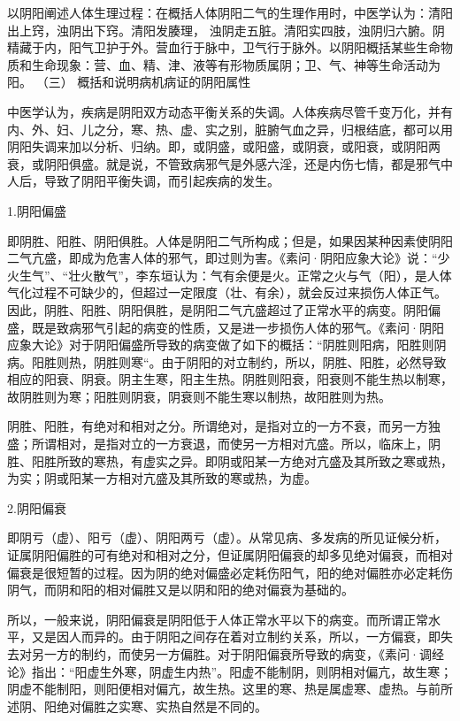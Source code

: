\documentclass[a4paper,12pt,UTF8,twoside]{ctexbook}
\begin{document}
以阴阳阐述人体生理过程：在概括人体阴阳二气的生理作用时，中医学认为：清阳出上窍，浊阴出下窍。清阳发腠理， 浊阴走五脏。清阳实四肢，浊阴归六腑。阴精藏于内，阳气卫护于外。营血行于脉中，卫气行于脉外。以阴阳概括某些生命物质和生命现象：营、血、精、津、液等有形物质属阴；卫、气、神等生命活动为阳。
（三） 概括和说明病机病证的阴阳属性

中医学认为，疾病是阴阳双方动态平衡关系的失调。人体疾病尽管千变万化，并有内、外、妇、儿之分，寒、热、虚、实之别，脏腑气血之异，归根结底，都可以用阴阳失调来加以分析、归纳。即，或阴盛，或阳盛，或阴衰，或阳衰，或阴阳两衰，或阴阳俱盛。就是说，不管致病邪气是外感六淫，还是内伤七情，都是邪气中人后，导致了阴阳平衡失调，而引起疾病的发生。

1.阴阳偏盛

即阴胜、阳胜、阴阳俱胜。人体是阴阳二气所构成；但是，如果因某种因素使阴阳二气亢盛，即成为危害人体的邪气，即过则为害。《素问·阴阳应象大论》说：“少火生气”、“壮火散气”，李东垣认为：气有余便是火。正常之火与气（阳），是人体气化过程不可缺少的，但超过一定限度（壮、有余），就会反过来损伤人体正气。因此，阴胜、阳胜、阴阳俱胜，是阴阳二气亢盛超过了正常水平的病变。阴阳偏盛，既是致病邪气引起的病变的性质，又是进一步损伤人体的邪气。《素问·阴阳应象大论》对于阴阳偏盛所导致的病变做了如下的概括：“阴胜则阳病，阳胜则阴病。阳胜则热，阴胜则寒“。由于阴阳的对立制约，所以，阴胜、阳胜，必然导致相应的阳衰、阴衰。阴主生寒，阳主生热。阴胜则阳衰，阳衰则不能生热以制寒，故阴胜则为寒；阳胜则阴衰，阴衰则不能生寒以制热，故阳胜则为热。

阴胜、阳胜，有绝对和相对之分。所谓绝对，是指对立的一方不衰，而另一方独盛；所谓相对，是指对立的一方衰退，而使另一方相对亢盛。所以，临床上，阴胜、阳胜所致的寒热，有虚实之异。即阴或阳某一方绝对亢盛及其所致之寒或热，为实；阴或阳某一方相对亢盛及其所致的寒或热，为虚。

2.阴阳偏衰

即阴亏（虚）、阳亏（虚）、阴阳两亏（虚）。从常见病、多发病的所见证候分析，证属阴阳偏胜的可有绝对和相对之分，但证属阴阳偏衰的却多见绝对偏衰，而相对偏衰是很短暂的过程。因为阴的绝对偏盛必定耗伤阳气，阳的绝对偏胜亦必定耗伤阴气，而阴和阳的相对偏胜又是以阴和阳的绝对偏衰为基础的。

所以，一般来说，阴阳偏衰是阴阳低于人体正常水平以下的病变。而所谓正常水平，又是因人而异的。由于阴阳之间存在着对立制约关系，所以，一方偏衰，即失去对另一方的制约，而使另一方偏胜。对于阴阳偏衰所导致的病变，《素问·调经论》指出：“阳虚生外寒，阴虚生内热”。阳虚不能制阴，则阴相对偏亢，故生寒；阴虚不能制阳，则阳便相对偏亢，故生热。这里的寒、热是属虚寒、虚热。与前所述阴、阳绝对偏胜之实寒、实热自然是不同的。
\end{document}
